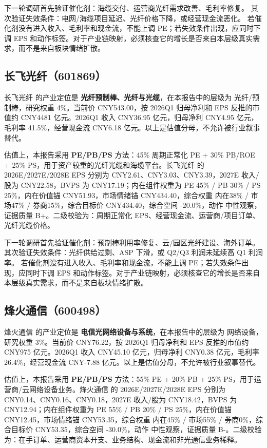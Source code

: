 下一轮调研首先验证催化剂：海缆交付、运营商光纤需求改善、毛利率修复。 其次验证失效条件：电网/海缆项目延迟、光纤价格下降，或经营现金流恶化。 若催化剂没有进入收入、毛利率和现金流，不能上调 PE；若失效条件出现，应同时下调 EPS 和动作标签。对于产业链映射，必须核查它的增长是否来自本层级真实需求，而不是来自板块情绪扩散。


\subsection{长飞光纤（601869）}
长飞光纤 的产业定位是 \textbf{光纤预制棒、光纤与光缆}，在本报告中的层级为 光纤/预制棒，研究权重 4\%。当前价 CNY543.00，按 2026Q1 归母净利和 EPS 反推的市值约 CNY4481 亿元。2026Q1 收入 CNY36.95 亿元，归母净利 CNY4.95 亿元，毛利率 41.5\%，经营现金流 CNY6.18 亿元。以上是估值分母，不允许被行业叙事替代。

估值上，本报告采用 \textbf{PE/PB/PS} 方法：45\% 周期正常化 PE + 30\% PB/ROE + 25\% PS，用于资产较重的光纤光缆和海缆平台。长飞光纤 的 2026E/2027E/2028E EPS 分别为 CNY2.61、CNY3.03、CNY3.39，2027E 收入/股为 CNY22.58，BVPS 为 CNY17.19；内在组件权重为 PE 45\% / PB 30\% / PS 25\%，内在价值锚 CNY51.93，市场情绪锚 CNY434.40，综合权重 内在38\% / 市场47\% / 券商15\%，综合目标价 CNY434.40，综合空间 -20.0\%，动作 中性观察，证据质量 B+。二级校验为：周期正常化 EPS、经营现金流、运营商/项目订单、光纤光缆价格。

下一轮调研首先验证催化剂：预制棒利用率修复、云/园区光纤建设、海外订单。 其次验证失效条件：光纤供给过剩、ASP 下滑，或 Q2/Q3 利润未延续高 Q1 利润率。 若催化剂没有进入收入、毛利率和现金流，不能上调 PE；若失效条件出现，应同时下调 EPS 和动作标签。对于产业链映射，必须核查它的增长是否来自本层级真实需求，而不是来自板块情绪扩散。


\subsection{烽火通信（600498）}
烽火通信 的产业定位是 \textbf{电信光网络设备与系统}，在本报告中的层级为 网络设备，研究权重 3\%。当前价 CNY76.22，按 2026Q1 归母净利和 EPS 反推的市值约 CNY975 亿元。2026Q1 收入 CNY45.10 亿元，归母净利 CNY0.38 亿元，毛利率 26.4\%，经营现金流 CNY-7.88 亿元。以上是估值分母，不允许被行业叙事替代。

估值上，本报告采用 \textbf{PE/PB/PS} 方法：55\% PE + 20\% PB + 25\% PS，用于运营商/云网络设备业务。烽火通信 的 2026E/2027E/2028E EPS 分别为 CNY0.14、CNY0.16、CNY0.18，2027E 收入/股为 CNY18.42，BVPS 为 CNY12.94；内在组件权重为 PE 55\% / PB 20\% / PS 25\%，内在价值锚 CNY12.45，市场情绪锚 CNY53.35，综合权重 内在45\% / 市场55\% / 券商0\%，综合目标价 CNY53.35，综合空间 -30.0\%，动作 中性观察，证据质量 B-。二级校验为：在手订单、运营商资本开支、业务结构、现金流和非光通信业务稀释。

